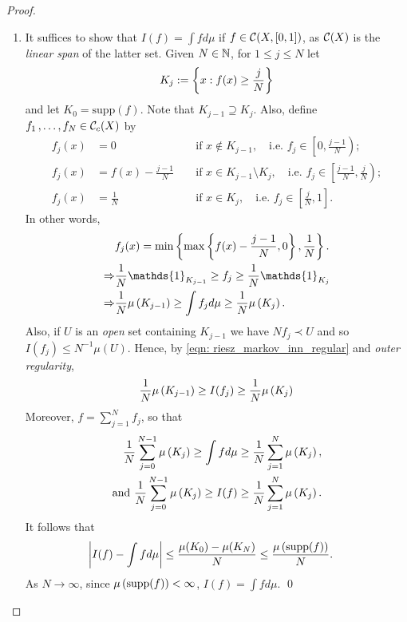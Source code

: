 \documentclass[11pt]{article}
\begin{document}
\begin{itemize}
\begin{proof}
\begin{enumerate}
\item It suffices to show that $I(f) = \int fd\mu$ if $f \in {\mathcal C}(X, [0,1])$, as ${\mathcal C}(X)$ is the \emph{linear span} of the latter set.  Given $N \in {\mathbb N}$, for $1\le j \le N$ let
\begin{align*}
K_j := \left\{x: f(x) \ge \frac{j}{N} \right\}
\end{align*} and let $K_0 = \text{supp}(f)$.  Note that $K_{j-1} \supseteq K_{j}$. Also, define $f_1 \,{,}\ldots{,}\, f_N \in {\mathcal C}_{c}(X)$ by 
\begin{align*}
f_{j}(x)& = 0 &&\text{ if }x\not\in K_{j-1}, \quad \text{i.e. } f_j \in \left[0, \frac{j-1}{N}\right); \\
f_{j}(x)&=f(x) -  \frac{j-1}{N}  &&\text{ if }x\in K_{j-1} \setminus K_j, \quad \text{i.e. } f_j \in \left[\frac{j-1}{N}, \frac{j}{N}\right); \\
f_{j}(x)&=\frac{1}{N}  &&\text{ if }x\in K_{j}, \quad\text{i.e. }  f_j \in \left[\frac{j}{N}, 1\right].
\end{align*} In other words,
\begin{align*}
&f_{j}(x) = \min\set{\max\set{f(x) -  \frac{j-1}{N}, 0}, \frac{1}{N}}. \\
\Rightarrow &\frac{1}{N}\mathds{1}_{K_{j-1}} \ge f_j \ge  \frac{1}{N}\mathds{1}_{K_j} \\
\Rightarrow &\frac{1}{N}\mu\paren{K_{j-1}} \ge \int  f_j d\mu \ge \frac{1}{N}\mu\paren{K_{j}}.
\end{align*} Also, if $U$ is an \emph{open} set containing $K_{j-1}$ we have $Nf_j \prec U$ and so $I(f_j) \le
N^{-1}\mu(U)$. Hence, by \eqref{eqn: riesz_markov_inn_regular} and \emph{outer regularity},
\begin{align*}
\frac{1}{N}\mu\left(K_{j-1}\right) \ge I(f_j) \ge \frac{1}{N}\mu\left(K_{j}\right)
\end{align*} Moreover, $f = \sum_{j=1}^{N} f_j$, so that
\begin{align*}
\frac{1}{N}\sum_{j=0}^{N-1}\mu\left(K_{j}\right) \ge \int  f d\mu \ge \frac{1}{N}\sum_{j=1}^{N}\mu\left(K_{j}\right),\\
\text{and }\frac{1}{N}\sum_{j=0}^{N-1}\mu\left(K_{j}\right) \ge I(f) \ge \frac{1}{N}\sum_{j=1}^{N}\mu\left(K_{j}\right).
\end{align*} It follows that 
\begin{align*}
\left\lvert I(f) - \int  f d\mu  \right\rvert &\le \frac{\mu(K_0) - \mu(K_N)}{N} \le \frac{\mu\left(\text{supp}(f)\right)}{N}.
\end{align*} As $N \rightarrow \infty$, since $\mu\left(\text{supp}(f)\right) < \infty$, $I(f) = \int  f d\mu$. \qed
\end{enumerate}
\end{proof}


\end{itemize}
\end{document}
